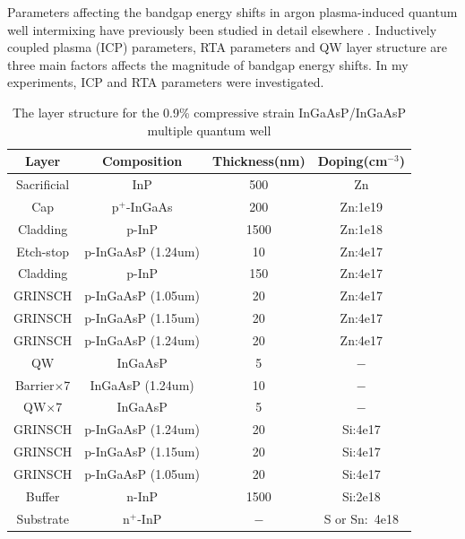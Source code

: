 Parameters affecting the bandgap energy shifts in argon
plasma-induced quantum well intermixing have previously been studied
in detail elsewhere \cite{icpparam}. Inductively coupled plasma
(ICP) parameters, RTA parameters and QW layer structure are three
main factors affects the magnitude of bandgap energy shifts. In my
experiments, ICP and RTA parameters were investigated.

\begin{table}[!t]
    \renewcommand{\arraystretch}{1.3}
    \caption{The layer structure for the 0.9\% compressive strain
        InGaAsP/InGaAsP multiple quantum well}
    \centering
    \label{mySample}
    \begin{tabular}{cccc}
        \hline
        \hline
        Layer & Composition & Thickness(nm) & Doping(cm$^{-3}$)\\
        \hline
        Sacrificial & InP                          & 500  & Zn\\
        Cap         & p$^+$-InGaAs                 & 200  & Zn:1e19\\
        Cladding    & p-InP                        & 1500 & Zn:1e18\\
        Etch-stop   & p-InGaAsP (1.24um)           & 10   & Zn:4e17\\
        Cladding    & p-InP                        & 150  & Zn:4e17\\
        GRINSCH     & p-InGaAsP (1.05um)           & 20   & Zn:4e17\\
        GRINSCH     & p-InGaAsP (1.15um)           & 20   & Zn:4e17\\
        GRINSCH     & p-InGaAsP (1.24um)           & 20   & Zn:4e17\\
        QW                 & InGaAsP               & 5    & $-$\\
        Barrier$\times$7   & InGaAsP (1.24um)      & 10   & $-$\\
        QW$\times$7        & InGaAsP               & 5    & $-$\\
        GRINSCH     & p-InGaAsP (1.24um)           & 20   & Si:4e17\\
        GRINSCH     & p-InGaAsP (1.15um)           & 20   & Si:4e17\\
        GRINSCH     & p-InGaAsP (1.05um)           & 20   & Si:4e17\\
        Buffer      & n-InP                        & 1500 & Si:2e18\\
        Substrate   & n$^+$-InP                    & $-$  & S or Sn:~4e18\\
        \hline
        \hline
    \end{tabular}
\end{table}
